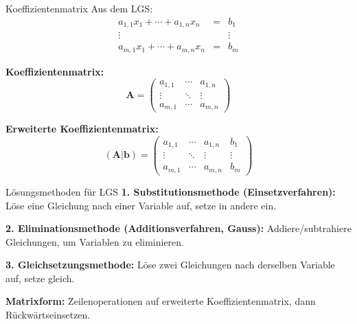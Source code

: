 \documentclass[a4paper, fontsize=7pt]{scrartcl}
\begin{document}
\begin{mainbox}{Koeffizientenmatrix}
Aus dem LGS:
$$\begin{array}{rcl}
a_{1,1}x_1 + \cdots + a_{1,n}x_n &=& b_1 \\
\vdots & & \vdots \\
a_{m,1}x_1 + \cdots + a_{m,n}x_n &=& b_m
\end{array}$$

\textbf{Koeffizientenmatrix:}
$$\mathbf{A} = \begin{pmatrix}
a_{1,1} & \cdots & a_{1,n} \\
\vdots & \ddots & \vdots \\
a_{m,1} & \cdots & a_{m,n}
\end{pmatrix}$$

\textbf{Erweiterte Koeffizientenmatrix:}
$$(\mathbf{A}|\mathbf{b}) = \left(\begin{array}{ccc|c}
a_{1,1} & \cdots & a_{1,n} & b_1 \\
\vdots & \ddots & \vdots & \vdots \\
a_{m,1} & \cdots & a_{m,n} & b_m
\end{array}\right)$$
\end{mainbox}

\begin{subbox}{Lösungsmethoden für LGS}
\textbf{1. Substitutionsmethode (Einsetzverfahren):} Löse eine Gleichung nach einer Variable auf, setze in andere ein.

\textbf{2. Eliminationsmethode (Additionsverfahren, Gauss):} Addiere/subtrahiere Gleichungen, um Variablen zu eliminieren.

\textbf{3. Gleichsetzungsmethode:} Löse zwei Gleichungen nach derselben Variable auf, setze gleich.

\textbf{Matrixform:} Zeilenoperationen auf erweiterte Koeffizientenmatrix, dann Rückwärtseinsetzen.
\end{subbox}
\end{document}
